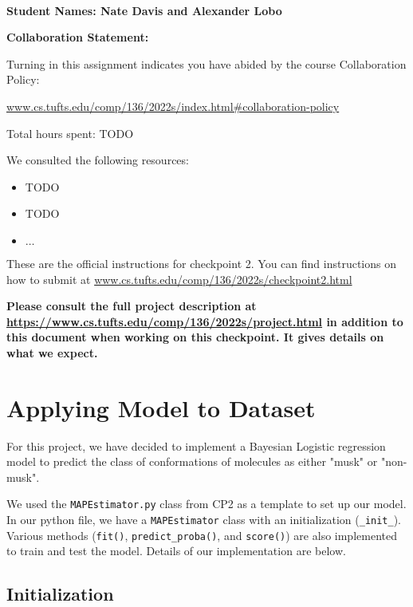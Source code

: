 \documentclass[12pt]{article}
\begin{document}
~~\\ %

\begin{center}
{\Large{\bf Student Names: Nate Davis and Alexander Lobo}}
\end{center}

{\Large{\bf Collaboration Statement:}}

Turning in this assignment indicates you have abided by the course Collaboration Policy:

\url{www.cs.tufts.edu/comp/136/2022s/index.html#collaboration-policy}

Total hours spent: TODO

We consulted the following resources:
\begin{itemize}
\item TODO
\item TODO
\item $\ldots$	
\end{itemize}

\newpage

These are the official instructions for checkpoint 2.  You can find instructions on how to submit at \url{www.cs.tufts.edu/comp/136/2022s/checkpoint2.html}

\textbf{Please consult the full project description at \url{https://www.cs.tufts.edu/comp/136/2022s/project.html} in addition to this document when working on this checkpoint.  It gives details on what we expect.}

\section{Applying Model to Dataset}

For this project, we have decided to implement a Bayesian Logistic regression model to predict the class of conformations of molecules as either "musk" or "non-musk".

We used the \texttt{MAPEstimator.py} class from CP2 as a template to set up our model. In our python file, we have a \texttt{MAPEstimator} class with an initialization (\texttt{\_init\_}). Various methods (\texttt{fit()}, \texttt{predict\_proba()}, and \texttt{score()}) are also implemented to train and test the model. Details of our implementation are below.

\subsection{Initialization}
\end{document}

